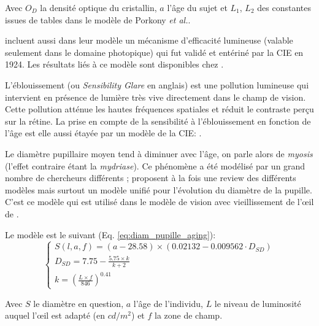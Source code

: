 	\par Avec $O_D$ la densité optique du cristallin, $a$ l'âge du sujet et $L_1$, $L_2$ des constantes issues de tables dans le modèle de Porkony \textit{et al.}.
	
	
	\par \citep{mantiuk_human_2015} incluent aussi dans leur modèle un mécanisme d'efficacité lumineuse (valable seulement dans le domaine photopique) qui fut validé et entériné par la CIE en 1924. Les résultats liés à ce modèle sont disponibles chez \citep{sagawa_spectral_2001}.
	
	\par L'éblouissement (ou \textit{Sensibility Glare} en anglais) est une pollution lumineuse qui intervient en présence de lumière très vive directement dans le champ de vision. Cette pollution atténue les hautes fréquences spatiales et réduit le contraste perçu sur la rétine. La prise en compte de la sensibilité à l'éblouissement en fonction de l'âge est elle aussi étayée par un modèle de la CIE: \citep{vos_cie_1999}.
	
	\par Le diamètre pupillaire moyen tend à diminuer avec l'âge, on parle alors de \textit{myosis} (l'effet contraire étant la \textit{mydriase}). Ce phénomène a été modélisé par un grand nombre de chercheurs différents ; \citep{watson_unified_2012} proposent à la fois une review des différents modèles mais surtout un modèle unifié pour l'évolution du diamètre de la pupille. C'est ce modèle qui est utilisé dans le modèle de vision avec vieillissement de l'œil de \citep{mantiuk_human_2015}.
	
	\par Le modèle est le suivant (Eq. \ref{eq:diam_pupille_aging}):
	\begin{equation}
		\begin{cases}
		S(l,a,f) = (a-28.58) \times (0.02132-0.009562 \cdot D_{SD})\\
		D_{SD} = 7.75 - \frac{5.75 \times k}{k+2}\\
		k = \left( \frac{L \times f}{846} \right)^{0.41}
		\end{cases}
		\label{eq:diam_pupille_aging}
	\end{equation}
	
	\par Avec $S$ le diamètre en question, $a$ l'âge de l'individu, $L$ le niveau de luminosité auquel l'œil est adapté (en $cd/m^2$) et $f$ la zone de champ.
	
